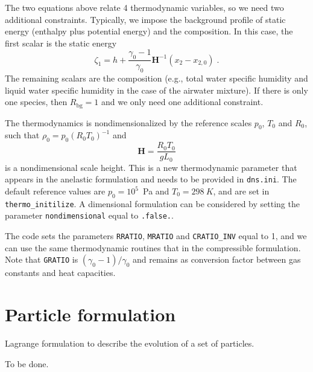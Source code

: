 The two equations above relate 4 thermodynamic variables, so we need two additional constraints. Typically, we impose the background profile of static energy (enthalpy plus potential energy) and the composition. In this case, the first scalar is the static energy
\begin{equation}
  \zeta_1 = h + \frac{\gamma_0-1}{\gamma_0}\mathbf{H}^{-1}(x_2-x_{2,0}) \;.
\end{equation}
The remaining scalars are the composition (e.g., total water specific humidity and liquid water specific humidity in the case of the airwater mixture). If there is only one species, then $R_\mathrm{bg}=1$ and we only need one additional constraint. 

The thermodynamics is nondimensionalized by the reference scales $p_0$, $T_0$ and $R_0$, such that $\rho_0=p_0(R_0T_0)^{-1}$ and
\begin{equation}
  \mathbf{H} = \frac{R_0T_0}{gL_0}
\end{equation}
is a nondimensional scale height. This is a new thermodynamic parameter that appears in the anelastic formulation and needs to be provided in \texttt{dns.ini}. The default reference values are $p_0=10^5$~Pa and $T_0=298~K$, and are set in \texttt{thermo\_initilize}. A dimensional formulation can be considered by setting the parameter \texttt{nondimensional} equal to \texttt{.false.}.

The code sets the parameters \texttt{RRATIO}, \texttt{MRATIO} and \texttt{CRATIO\_INV} equal to 1, and we can use the same thermodynamic routines that in the compressible formulation. Note that \texttt{GRATIO} is $(\gamma_0-1)/\gamma_0$ and remains as conversion factor between gas constants and heat capacities.

\section{Particle formulation}

Lagrange formulation to describe the evolution of a set of particles.

To be done.